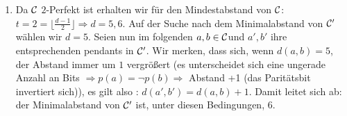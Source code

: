 \begin{aufgabe}[Paritätscode][4]
\begin{enumerate}[label=\alph*)]
    \item Da \({\cal C}\) \(2\)-Perfekt ist erhalten wir für den Mindestabstand von \({\cal C}\):\\
    \(t = 2 = \lfloor \frac{d-1}{2} \rfloor \Rightarrow d = 5,6\). Auf der Suche nach dem Minimalabstand von \({\cal C}'\) wählen wir \(d = 5\). Seien nun im folgenden \(a,b \in {\cal C}\)und \(a',b'\) ihre entsprechenden pendants in \({\cal C}'\). Wir merken, dass sich, wenn \(d(a,b) = 5\), der Abstand immer um \(1\) vergrößert (es unterscheidet sich eine ungerade Anzahl an Bits \(\Rightarrow p(a) = \neg p(b) \Rightarrow\) Abstand +1 (das Paritätsbit invertiert sich)), es gilt also : \(d(a',b')=d(a,b)+1\). Damit leitet sich ab: der Minimalabstand von \({\cal C}'\) ist, unter diesen Bedingungen, \(6\).
\end{enumerate}
\end{aufgabe}
